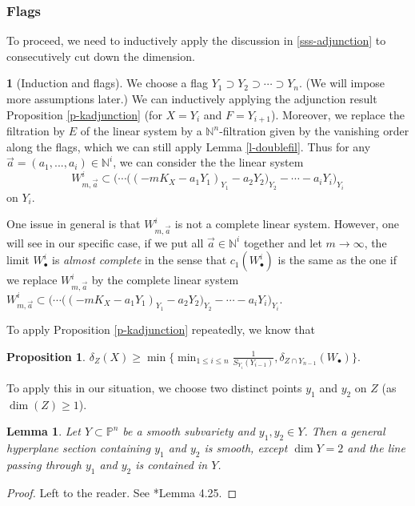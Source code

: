 \documentclass[12pt,reqno]{amsart}%
\newcommand{\bN}{{\mathbb{N} }}
\newtheorem{lem}[thm]{Lemma}
\newtheorem{prop}[thm]{Proposition}
\theoremstyle{definition}
\newtheorem{say}[thm]{}
\theoremstyle{remark}
\begin{document}
\subsubsection{Flags} To proceed, we need to inductively apply the discussion in \ref{sss-adjunction} to consecutively cut down the dimension.
\begin{say}[Induction and flags]\label{say-flag} We choose a flag $Y_1\supset Y_2\supset \cdots \supset Y_{n}$. (We will impose more assumptions later.) We can inductively applying the adjunction result Proposition \ref{p-kadjunction} (for $X=Y_i$ and $F=Y_{i+1}$). Moreover, we replace the filtration by $E$ of the linear system by a $\bN^n$-filtration given by the vanishing order along the flags, which we can still apply Lemma \ref{l-doublefil}. Thus for any $\overrightarrow{a}=(a_1,...,a_i)\in \bN^i$, we can consider the the linear system 
$$W_{m,\overrightarrow{a}}^{i}\subset \Big(\cdots \big((-mK_X-a_1Y_1)_{Y_1}-a_2Y_2\big)_{Y_2}-\cdots  - a_iY_i\Big)_{Y_i}$$ on $Y_i$.

One issue in general is that  $W_{m,\overrightarrow{a}}^{i}$ is not a complete linear system. However, one will see in our specific case, if we put all $\overrightarrow{a}\in \bN^i$ together and let $m\to \infty$,  the limit $W^i_{\bullet}$ is {\it almost complete} in the sense that $c_1(W^i_{\bullet})$ is the same as the one if we replace $W_{m,\overrightarrow{a}}^{i}$  by the complete linear system  $W_{m,\overrightarrow{a}}^{i}\subset \Big(\cdots \big((-mK_X-a_1Y_1)_{Y_1}-a_2Y_2\big)_{Y_2}-\cdots - a_iY_i\Big)_{Y_i}$.
\end{say}

To apply Proposition \ref{p-kadjunction} repeatedly, we know that
\begin{prop}
$\delta_Z(X)\ge \min\{\min_{1\le i \le n}\frac{1}{S_{Y_i}(Y_{i-1})},  \delta_{Z\cap Y_{n-1}}(W_{\bullet})  \}. $
\end{prop}

To apply this in our situation, we choose two distinct points $y_1$ and $y_2$ on $Z$ (as $\dim(Z)\ge 1$). 
\begin{lem}Let $Y\subset \mathbb{P}^n$ be a smooth subvariety and $y_1, y_2\in Y$. Then a general hyperplane section containing $y_1$ and $y_2$ is smooth, except $\dim Y=2$ and the line passing through $y_1$ and $y_2$ is contained in $Y$.
\end{lem}
\begin{proof}Left to the reader. See \cite{AZ20}*{Lemma 4.25}.
\end{proof}
\end{document}
